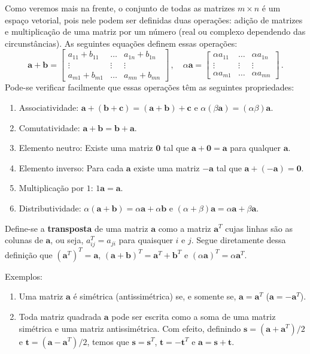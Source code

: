 \documentclass[12pt,a4paper]{report}
\newcommand{\tb}{\textbf}
\newcommand{\mb}{\mathbf}
\begin{document}
Como veremos mais na frente, o conjunto de todas as matrizes $m\times n$ é um espaço vetorial, pois nele podem ser definidas duas operações: adição de matrizes e multiplicação de uma matriz por um número (real ou complexo dependendo das circunstâncias). As seguintes equações definem essas operações:
$$\mb{a}+\mb{b}=\begin{bmatrix}
  a_{11}+b_{11}&\ldots&a_{1n}+b_{1n}\\
  \vdots&\vdots&\vdots\\
  a_{m1}+b_{m1}&\ldots&a_{mn}+b_{mn}
\end{bmatrix}\,,\quad
\alpha\mb{a}=\begin{bmatrix}
  \alpha a_{11}&\ldots&\alpha a_{1n}\\
  \vdots&\vdots&\vdots\\
  \alpha a_{m1}&\ldots&\alpha a_{mn}
\end{bmatrix}\,.$$
Pode-se verificar facilmente que essas operações têm as seguintes propriedades:
\begin{enumerate}
  \item Associatividade: $\mb{a}+(\mb{b}+\mb{c})=(\mb{a}+\mb b)+\mb c$ e $\alpha(\beta \mb a)=(\alpha\beta)\mb a$.
  \item Comutatividade: $\mb a+\mb b=\mb b+\mb a$.
  \item Elemento neutro: Existe uma matriz $\mb 0$ tal que $\mb a+\mb 0=\mb a$ para qualquer $\mb a$.
  \item Elemento inverso: Para cada $\mb a$ existe uma matriz $-\mb a$ tal que $\mb a+(-\mb a)=\mb 0$.
  \item Multiplicação por $1$: $1\mb a=\mb a$.
  \item Distributividade: $\alpha(\mb a+\mb b)=\alpha\mb a+\alpha\mb b$ e $(\alpha+\beta)\mb a=\alpha\mb a+\beta\mb a$.
\end{enumerate}

Define-se a \tb{transposta} de uma matriz $\mb a$ como a matriz $\mb a^T$ cujas linhas são as colunas de $\mb a$, ou seja, $a_{ij}^T=a_{ji}$ para quaisquer $i$ e $j$. Segue diretamente dessa definição que $(\mb a^T)^T=\mb a$, $(\mb a+\mb b)^T=\mb a^T+\mb b^T$ e $(\alpha\mb a)^T=\alpha\mb a^T$.

Exemplos:

\begin{enumerate}
  \item Uma matriz $\mb a$ é simétrica (antissimétrica) se, e somente se, $\mb a=\mb a^T$ ($\mb a=-\mb a^T$).
  \item Toda matriz quadrada $\mb a$ pode ser escrita como a soma de uma matriz simétrica e uma matriz antissimétrica. Com efeito, definindo $\mb s=(\mb a+\mb a^T)/2$ e $\mb t=(\mb a-\mb a^T)/2$, temos que $\mb s=\mb s^T$, $\mb t=-\mb t^T$ e $\mb a=\mb s+\mb t$.
\end{enumerate}
\end{document}
